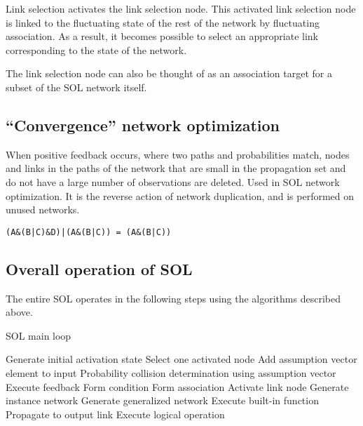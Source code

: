 \documentclass[12pt]{article}
\begin{document}
Link selection activates the link selection node. This activated link
selection node is linked to the fluctuating state of the rest of the
network by fluctuating association. As a result, it becomes possible to
select an appropriate link corresponding to the state of the network.

The link selection node can also be thought of as an association target
for a subset of the SOL network itself.

\subsection{``Convergence'' network
optimization}\label{convergence-network-optimization}

When positive feedback occurs, where two paths and probabilities match,
nodes and links in the paths of the network that are small in the
propagation set and do not have a large number of observations are
deleted. Used in SOL network optimization. It is the reverse action of
network duplication, and is performed on unused networks.


\begin{verbatim}
(A&(B|C)&D)|(A&(B|C)) = (A&(B|C))
\end{verbatim}

\subsection{Overall operation of SOL}\label{overall-operation-of-sol}

The entire SOL operates in the following steps using the algorithms described above.

  \begin{algorithm}
  \caption{SOL main loop}
  \begin{algorithmic}[1]
      \State Generate initial activation state
          \State Select one activated node
              \State Add assumption vector element to input
          \EndIf
          \State Probability collision determination using assumption vector
              \State Execute feedback
                \State Form condition
              \Else
                \State Form association
                \State Activate link node
              \EndIf
              \State Generate instance network
              \State Generate generalized network
          \EndIf
          \State Execute built-in function
              \State Propagate to output link
              \State Execute logical operation
          \EndFor
      \EndWhile
  \end{algorithmic}
  \end{algorithm}
\end{document}
